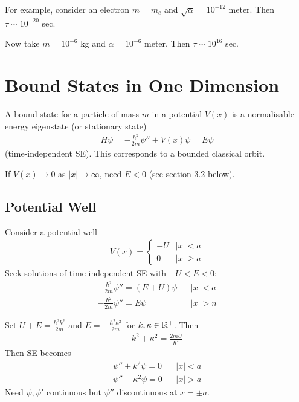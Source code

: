 \documentclass[a4paper]{article}
\begin{document}
For example, consider an electron $m=m_e$ and $\sqrt{\alpha} = 10^{-12}$ meter. Then $ \tau \sim 10^{-20}$ sec.

Now take $m=10^{-6}$ kg and $\alpha = 10^{-6}$ meter. Then $\tau \sim 10^{16}$ sec.

\newpage

\section{Bound States in One Dimension}

A bound state for a particle of mass $m$ in a potential $V\left(x\right)$ is a normalisable energy eigenstate (or stationary state)
\begin{equation*}
\begin{aligned}
H\psi = -\frac{\hbar^2}{2m} \psi'' + V\left(x\right) \psi = E\psi
\end{aligned}
\end{equation*}
(time-independent SE). This corresponds to a bounded classical orbit.

If $V\left(x\right) \to 0$ as $|x| \to \infty$, need $E < 0$ (see section 3.2 below).

\subsection{Potential Well}
Consider a potential well
\begin{equation*}
\begin{aligned}
V\left(x\right) = \left\{ \begin{array}{ll}
-U & |x|<a \\
0 & |x| \geq a
\end{array}
\right.
\end{aligned}
\end{equation*}
Seek solutions of time-independent SE with $-U<E<0$:
\begin{equation*}
\begin{aligned}
-\frac{\hbar^2}{2m}\psi'' = \left(E+U\right)\psi & &|x|<a\\
-\frac{\hbar^2}{2m}\psi'' = E\psi & &|x|>n
\end{aligned}
\end{equation*}

Set $U+E = \frac{\hbar^2 k^2}{2m}$ and $E=-\frac{\hbar^2\kappa^2}{2m}$ for $k,\kappa \in \mathbb{R}^+$. Then
\begin{equation*}
\begin{aligned}
k^2 + \kappa^2 = \frac{2mU}{\hbar^2}
\end{aligned}
\end{equation*}
Then SE becomes
\begin{equation*}
\begin{aligned}
\psi'' + k^2 \psi = 0 & & |x|<a\\
\psi'' - \kappa^2 \psi = 0 & & |x|>a
\end{aligned}
\end{equation*}
Need $\psi,\psi'$ continuous but $\psi''$ discontinuous at $x = \pm a$.
\end{document}
